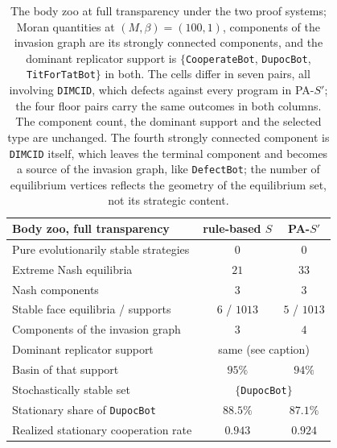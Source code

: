 %
\begin{table}[t]
\centering
\begin{tabular}{lcc}
\toprule
Body zoo, full transparency & rule-based $S$ & PA-$S'$ \\
\midrule
Pure evolutionarily stable strategies & $0$ & $0$ \\
Extreme Nash equilibria & $21$ & $33$ \\
Nash components & $3$ & $3$ \\
Stable face equilibria / supports & $6$ / $1013$ & $5$ / $1013$ \\
Components of the invasion graph & $3$ & $4$ \\
Dominant replicator support & \multicolumn{2}{c}{same (see caption)} \\
Basin of that support & $95\%$ & $94\%$ \\
Stochastically stable set & \multicolumn{2}{c}{$\{$\texttt{DupocBot}$\}$} \\
Stationary share of \texttt{DupocBot} & $88.5\%$ & $87.1\%$ \\
Realized stationary cooperation rate & $0.943$ & $0.924$ \\
\bottomrule
\end{tabular}
\caption{The body zoo at full transparency under the two proof systems; Moran quantities at $(M,\beta)=(100,1)$, components of the invasion graph are its strongly connected components, and the dominant replicator support is $\{$\texttt{CooperateBot}, \texttt{DupocBot}, \texttt{TitForTatBot}$\}$ in both. The cells differ in seven pairs, all involving \texttt{DIMCID}, which defects against every program in PA-$S'$; the four floor pairs carry the same outcomes in both columns. The component count, the dominant support and the selected type are unchanged. The fourth strongly connected component is \texttt{DIMCID} itself, which leaves the terminal component and becomes a source of the invasion graph, like \texttt{DefectBot}; the number of equilibrium vertices reflects the geometry of the equilibrium set, not its strategic content.}
\label{tab:sprime-vs-rule-system}
\end{table}
